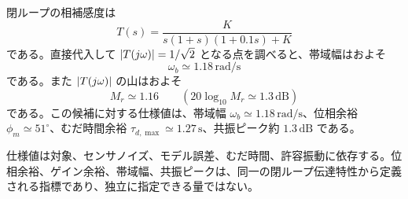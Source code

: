\begin{example}[温度制御ループの周波数仕様]
閉ループの相補感度は
\begin{equation}
  T(s)=\frac{K}{s(1+s)(1+0.1s)+K}
\end{equation}
である。直接代入して $\left|T(j\omega)\right|=1/\sqrt{2}$ となる点を調べると、帯域幅はおよそ
\begin{equation}
  \omega_b\simeq 1.18\,\mathrm{rad/s}
\end{equation}
である。また $\left|T(j\omega)\right|$ の山はおよそ
\begin{equation}
  M_r\simeq 1.16
  \qquad (20\log_{10}M_r\simeq 1.3\,\mathrm{dB})
\end{equation}
である。この候補に対する仕様値は、帯域幅 $\omega_b\simeq1.18\,\mathrm{rad/s}$、位相余裕 $\phi_m\simeq51^\circ$、むだ時間余裕 $\tau_{d,\max}\simeq1.27\,\mathrm{s}$、共振ピーク約 $1.3\,\mathrm{dB}$ である。
\end{example}

仕様値は対象、センサノイズ、モデル誤差、むだ時間、許容振動に依存する。位相余裕、ゲイン余裕、帯域幅、共振ピークは、同一の閉ループ伝達特性から定義される指標であり、独立に指定できる量ではない。
